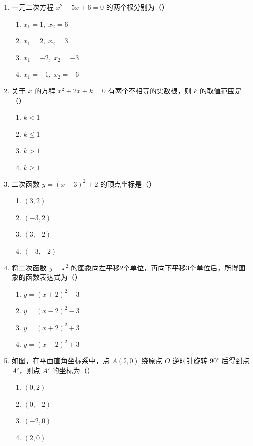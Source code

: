 \documentclass[12pt, a4paper]{ctexart}
\begin{document}
\begin{enumerate}[label=\arabic*.]

\item 一元二次方程 $x^2 - 5x + 6 = 0$ 的两个根分别为（\quad）
\begin{enumerate}[label=\Alph*.]
\item $x_1 = 1,\; x_2 = 6$
\item $x_1 = 2,\; x_2 = 3$
\item $x_1 = -2,\; x_2 = -3$
\item $x_1 = -1,\; x_2 = -6$
\end{enumerate}

\item 关于 $x$ 的方程 $x^2 + 2x + k = 0$ 有两个不相等的实数根，则 $k$ 的取值范围是（\quad）
\begin{enumerate}[label=\Alph*.]
\item $k < 1$
\item $k \leqslant 1$
\item $k > 1$
\item $k \geqslant 1$
\end{enumerate}

\item 二次函数 $y = (x - 3)^2 + 2$ 的顶点坐标是（\quad）
\begin{enumerate}[label=\Alph*.]
\item $(3, 2)$
\item $(-3, 2)$
\item $(3, -2)$
\item $(-3, -2)$
\end{enumerate}

\item 将二次函数 $y = x^2$ 的图象向左平移2个单位，再向下平移3个单位后，所得图象的函数表达式为（\quad）
\begin{enumerate}[label=\Alph*.]
\item $y = (x + 2)^2 - 3$
\item $y = (x - 2)^2 - 3$
\item $y = (x + 2)^2 + 3$
\item $y = (x - 2)^2 + 3$
\end{enumerate}

\item 如图，在平面直角坐标系中，点 $A(2, 0)$ 绕原点 $O$ 逆时针旋转 $90^\circ$ 后得到点 $A'$，则点 $A'$ 的坐标为（\quad）
\begin{enumerate}[label=\Alph*.]
\item $(0, 2)$
\item $(0, -2)$
\item $(-2, 0)$
\item $(2, 0)$
\end{enumerate}


\end{enumerate}
\end{document}
